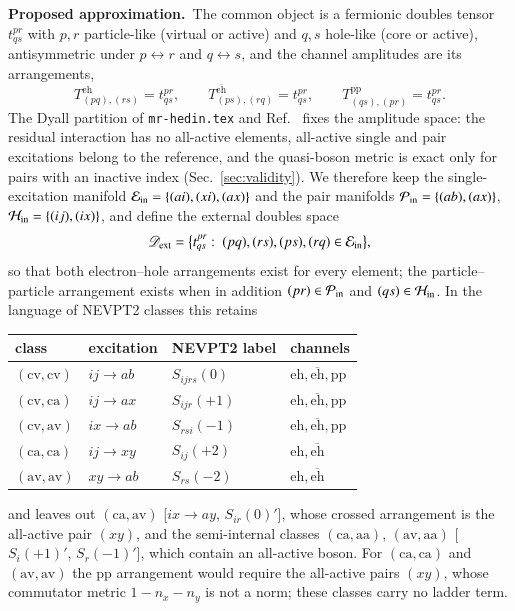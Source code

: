 \documentclass[aip,jcp,reprint,noshowkeys,superscriptaddress]{revtex4-1}
\newcommand{\eh}{\text{eh}}
\newcommand{\teh}{\overline{\text{eh}}}
\newcommand{\pp}{\text{pp}}
\newcommand{\scv}{\text{cv}}
\newcommand{\sca}{\text{ca}}
\newcommand{\sav}{\text{av}}
\newcommand{\saa}{\text{aa}}
\newcommand{\Proposed}{\textbf{Proposed approximation.}\ }
\begin{document}
\Proposed The common object is a fermionic doubles tensor $t^{pr}_{qs}$ with
$p,r$ particle-like (virtual or active) and $q,s$ hole-like (core or active),
antisymmetric under $p\leftrightarrow r$ and $q\leftrightarrow s$, and the
channel amplitudes are its arrangements,
\begin{equation}
  T^{\eh}_{(pq),(rs)}=t^{pr}_{qs},\qquad
  T^{\teh}_{(ps),(rq)}=t^{pr}_{qs},\qquad
  T^{\pp}_{(qs),(pr)}=t^{pr}_{qs} .
  \label{eq:J-ext}
\end{equation}
The Dyall partition of \texttt{mr-hedin.tex} and Ref.~\cite{WangFangLi2026} fixes the amplitude space: the
residual interaction has no all-active elements, all-active single and pair
excitations belong to the reference, and the quasi-boson metric is exact
only for pairs with an inactive index (Sec.~\ref{sec:validity}).  We
therefore keep the single-excitation manifold
$\mathcal E_{\rm in}=\{(ai),(xi),(ax)\}$ and the pair manifolds
$\mathcal P_{\rm in}=\{(ab),(ax)\}$, $\mathcal H_{\rm in}=\{(ij),(ix)\}$, and
define the external doubles space
\begin{equation}
  \mathscr D_{\rm ext}=\bigl\{t^{pr}_{qs}:\ (pq),(rs),(ps),(rq)\in\mathcal E_{\rm in}\bigr\},
  \label{eq:Dext}
\end{equation}
so that both electron--hole arrangements exist for every element; the
particle--particle arrangement exists when in addition
$(pr)\in\mathcal P_{\rm in}$ and $(qs)\in\mathcal H_{\rm in}$.  In the
language of NEVPT2 classes this retains
\begin{center}
\begin{tabular}{llll}
class & excitation & NEVPT2 label & channels\\\hline
$(\scv,\scv)$ & $ij\to ab$ & $S_{ijrs}(0)$ & $\eh,\teh,\pp$\\
$(\scv,\sca)$ & $ij\to ax$ & $S_{ijr}(+1)$ & $\eh,\teh,\pp$\\
$(\scv,\sav)$ & $ix\to ab$ & $S_{rsi}(-1)$ & $\eh,\teh,\pp$\\
$(\sca,\sca)$ & $ij\to xy$ & $S_{ij}(+2)$ & $\eh,\teh$\\
$(\sav,\sav)$ & $xy\to ab$ & $S_{rs}(-2)$ & $\eh,\teh$
\end{tabular}
\end{center}
and leaves out $(\sca,\sav)$ [$ix\to ay$, $S_{ir}(0)'$], whose crossed
arrangement is the all-active pair $(xy)$, and the semi-internal classes
$(\sca,\saa)$, $(\sav,\saa)$ [$S_{i}(+1)'$, $S_{r}(-1)'$], which contain an
all-active boson.  For $(\sca,\sca)$ and $(\sav,\sav)$ the pp arrangement
would require the all-active pairs $(xy)$, whose commutator metric
$1-n_x-n_y$ is not a norm; these classes carry no ladder term.
\end{document}
